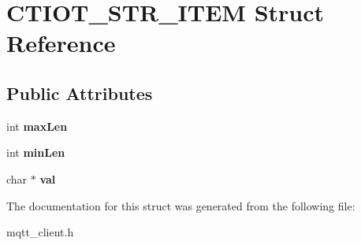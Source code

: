 \hypertarget{struct_c_t_i_o_t___s_t_r___i_t_e_m}{}\section{C\+T\+I\+O\+T\+\_\+\+S\+T\+R\+\_\+\+I\+T\+EM Struct Reference}
\label{struct_c_t_i_o_t___s_t_r___i_t_e_m}
\subsection*{Public Attributes}
\begin{DoxyCompactItemize}
\item 
\mbox{\label{struct_c_t_i_o_t___s_t_r___i_t_e_m_a11163abd99e03b4855ec437ddcaf4a2e}} 
int {\bfseries max\+Len}
\item 
\mbox{\label{struct_c_t_i_o_t___s_t_r___i_t_e_m_a5a3d85703307bc97f2a356969933bf7d}} 
int {\bfseries min\+Len}
\item 
\mbox{\label{struct_c_t_i_o_t___s_t_r___i_t_e_m_abbcb025391e369ac60672d4ddf5ed2ce}} 
char $\ast$ {\bfseries val}
\end{DoxyCompactItemize}


The documentation for this struct was generated from the following file\+:\begin{DoxyCompactItemize}
\item 
mqtt\+\_\+client.\+h\end{DoxyCompactItemize}
